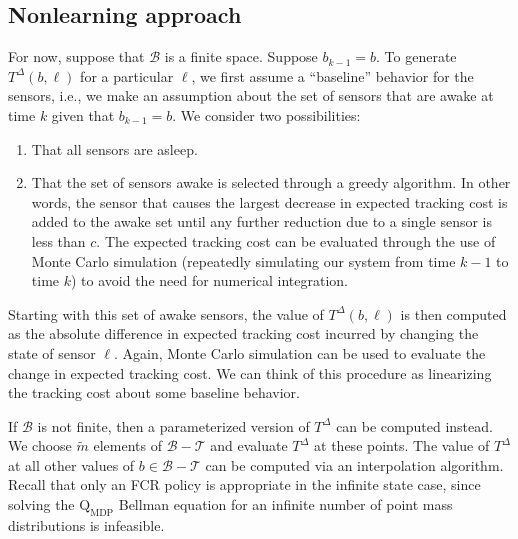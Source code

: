 \documentclass[journal,draftcls,onecolumn,11pt]{IEEEtran}
\newcommand{\QMDP}{$\text{Q}_{\text{MDP}}$}
\newcommand{\term}{\mathcal{T}}
\begin{document}
\subsection{Nonlearning approach}
\label{sec:non_learning}
For now, suppose that $\mathcal{B}$ is a finite space.  Suppose $b_{k-1} = b$.  To generate $T^\Delta(b,\ell)$ for a particular $\ell$, we first assume a ``baseline'' behavior for the sensors, i.e., we make an assumption about the set of sensors that are awake at time $k$ given that $b_{k-1} = b$.  We consider two possibilities:
\begin{enumerate}
   \item That all sensors are asleep.
   \item That the set of sensors awake is selected through a greedy algorithm.  In other words, the sensor that causes the largest decrease in expected tracking cost is added to the awake set until any further reduction due to a single sensor is less than $c$.  The expected tracking cost can be evaluated through the use of Monte Carlo simulation (repeatedly simulating our system from time $k-1$ to time $k$) to avoid the need for numerical integration.
\end{enumerate}
Starting with this set of awake sensors, the value of $T^\Delta(b,\ell)$ is then computed as the absolute difference in expected tracking cost incurred by changing the state of sensor $\ell$.  Again, Monte Carlo simulation can be used to evaluate the change in expected tracking cost.  We can think of this procedure as linearizing the tracking cost about some baseline behavior.

If $\mathcal{B}$ is not finite, then a parameterized version of $T^\Delta$ can be computed instead.  We choose $\tilde{m}$ elements of $\mathcal{B} - \term$ and evaluate $T^\Delta$ at these points.  The value of $T^\Delta$ at all other values of $b \in \mathcal{B} - \term$ can be computed via an interpolation algorithm.  Recall that only an FCR policy is appropriate in the infinite state case, since solving the \QMDP{} Bellman equation for an infinite number of point mass distributions is infeasible.
\end{document}
